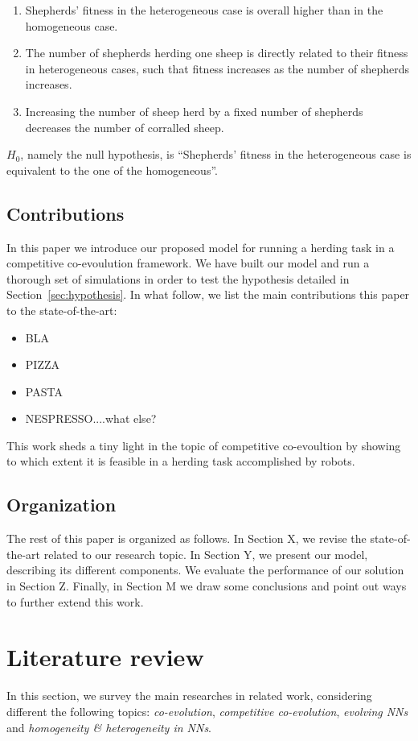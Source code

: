 \documentclass[conference]{IEEEtran}
\begin{document}
\begin{enumerate}
	\item Shepherds' fitness in the heterogeneous case is overall higher than in the homogeneous case.
	\item The number of shepherds herding one sheep is directly related to their fitness in heterogeneous cases, such that fitness increases as the number of shepherds increases.	
	\item Increasing the number of sheep herd by a fixed number of shepherds decreases the number of corralled sheep.
\end{enumerate}
$H_0$, namely the null hypothesis, is ``Shepherds’ fitness in the heterogeneous case is equivalent to the one of the homogeneous''.

\subsection{Contributions}
In this paper we introduce our proposed model for running a herding task in a competitive co-evoulution framework. 
We have built our model and run a thorough set of simulations in order to test the hypothesis detailed in Section~\ref{sec:hypothesis}. 
In what follow, we list the main contributions this paper to the state-of-the-art:
\begin{itemize}
	\item BLA
	\item PIZZA
	\item PASTA
	\item NESPRESSO....what else?
\end{itemize}

This work sheds a tiny light in the topic of competitive co-evoultion by showing to which extent it is feasible in a herding task accomplished by robots.

\subsection{Organization}
The rest of this paper is organized as follows. 
In Section X, we revise the state-of-the-art related to our research topic. 
In Section Y, we present our model, describing its different components. 
We evaluate the performance of our solution in Section Z. 
Finally, in Section M we draw some conclusions and point out ways to further extend this work.

\section{Literature review}
In this section, we survey the main researches in related work, considering different the following topics: \textit{co-evolution}, \textit{competitive co-evolution}, \textit{evolving NNs} and \textit{homogeneity \& heterogeneity in NNs}.
 
\end{document}
